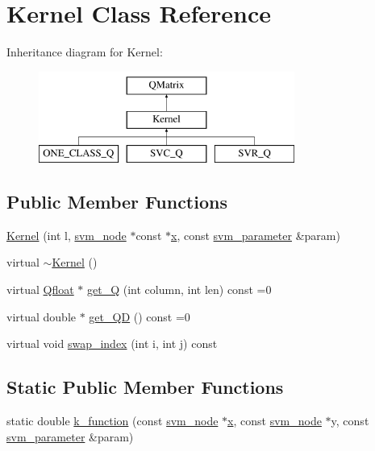 \hypertarget{classKernel}{}\section{Kernel Class Reference}
\label{classKernel}
Inheritance diagram for Kernel\+:\begin{figure}[H]
\begin{center}
\leavevmode
\includegraphics[height=3.000000cm]{classKernel}
\end{center}
\end{figure}
\subsection*{Public Member Functions}
\begin{DoxyCompactItemize}
\item 
\hyperlink{classKernel_a25ffaa0c67cc5b8c7fcdb6f97ca1725f}{Kernel} (int l, \hyperlink{structsvm__node}{svm\+\_\+node} $\ast$const $\ast$\hyperlink{classKernel_a725a35660c4309605c2628fa8290ce5f}{x}, const \hyperlink{structsvm__parameter}{svm\+\_\+parameter} \&param)
\item 
virtual \hyperlink{classKernel_a9c7407e3a0b1cb9b2f96e9a030187064}{$\sim$\+Kernel} ()
\item 
virtual \hyperlink{svm__core_8cpp_a8755d90a54ecfb8d15051af3e0542592}{Qfloat} $\ast$ \hyperlink{classKernel_a02f328649424359b92b941f5219a6060}{get\+\_\+Q} (int column, int len) const  =0
\item 
virtual double $\ast$ \hyperlink{classKernel_a7bf9602583da1af48d15d19da69514ac}{get\+\_\+\+QD} () const  =0
\item 
virtual void \hyperlink{classKernel_adca807c5584bc42fd098cd9eb1f19621}{swap\+\_\+index} (int i, int j) const 
\end{DoxyCompactItemize}
\subsection*{Static Public Member Functions}
\begin{DoxyCompactItemize}
\item 
static double \hyperlink{classKernel_a6ff0d4ac64bf7fba29d2ca3433dd5127}{k\+\_\+function} (const \hyperlink{structsvm__node}{svm\+\_\+node} $\ast$\hyperlink{classKernel_a725a35660c4309605c2628fa8290ce5f}{x}, const \hyperlink{structsvm__node}{svm\+\_\+node} $\ast$y, const \hyperlink{structsvm__parameter}{svm\+\_\+parameter} \&param)
\end{DoxyCompactItemize}
